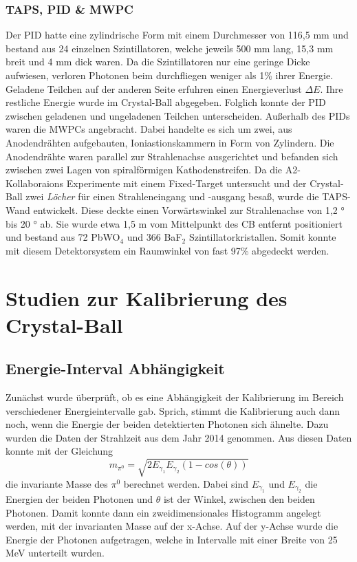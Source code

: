 \documentclass[a4paper,11pt,oneside,final,german,openbib,pdftex]{scrbook}
\begin{document}
{\subsection{TAPS, PID \& MWPC}
Der PID hatte eine zylindrische Form mit einem Durchmesser von 116,5 mm und bestand aus 24 einzelnen Szintillatoren, welche jeweils 500 mm lang, 15,3 mm breit und 4 mm dick waren. Da die Szintillatoren nur eine geringe Dicke aufwiesen, verloren Photonen beim durchfliegen weniger als 1\% ihrer Energie. Geladene Teilchen auf der anderen Seite erfuhren einen Energieverlust $\Delta E$. Ihre restliche Energie wurde im Crystal-Ball abgegeben. Folglich konnte der PID zwischen geladenen und ungeladenen Teilchen unterscheiden. 
Au{\ss}erhalb des PIDs waren die MWPCs angebracht. Dabei handelte es sich um zwei, aus Anodendr\"ahten aufgebauten, Ioniastionskammern in Form von Zylindern. Die Anodendr\"ahte waren parallel zur Strahlenachse ausgerichtet und befanden sich zwischen zwei Lagen von spiralf\"ormigen Kathodenstreifen. 
Da die A2-Kollaboraions Experimente mit einem Fixed-Target untersucht und der Crystal-Ball zwei \textit{L\"ocher} f\"ur einen Strahleneingang und -ausgang besa{\ss}, wurde die TAPS-Wand entwickelt. Diese deckte einen Vorw\"artswinkel zur Strahlenachse von 1,2 ° bis 20 ° ab. Sie wurde etwa 1,5 m vom Mittelpunkt des CB entfernt positioniert und bestand aus 72 PbWO$_4$ und 366 BaF$_2$ Szintillatorkristallen. Somit konnte mit diesem Detektorsystem ein Raumwinkel von fast 97\% abgedeckt werden.


\chapter{Studien zur Kalibrierung des Crystal-Ball}

\section{Energie-Interval Abhängigkeit}

Zunächst wurde überprüft, ob es eine Abhängigkeit der Kalibrierung im Bereich verschiedener Energieintervalle gab. Sprich, stimmt die Kalibrierung auch dann noch, wenn die Energie der beiden detektierten Photonen sich ähnelte. Dazu wurden die Daten der Strahlzeit aus dem Jahr 2014 genommen. Aus diesen Daten konnte mit der Gleichung
\begin{equation}
m_{\pi^0}=\sqrt{2E_{\gamma_1}E_{\gamma_2}(1-cos(\theta))}
\label{eq:invariantmass}
\end{equation}
die invariante Masse des $\pi^0$ berechnet werden. Dabei sind $E_{\gamma_1}$ und $E_{\gamma_2}$ die Energien der beiden Photonen und $\theta$ ist der Winkel, zwischen den beiden Photonen. 
Damit konnte dann ein zweidimensionales Histogramm angelegt werden, mit der invarianten Masse auf der x-Achse. Auf der y-Achse wurde die Energie der Photonen aufgetragen, welche in Intervalle mit einer Breite von 25 MeV unterteilt wurden. 


}
\end{document}
